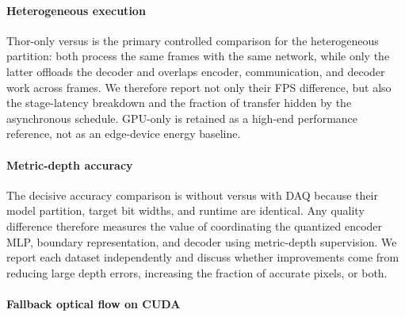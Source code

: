 \paragraph{Heterogeneous execution}
Thor-only versus \system{} is the primary controlled comparison for the
heterogeneous partition: both process the same frames with the same network,
while only the latter offloads the decoder and overlaps encoder,
communication, and decoder work across frames.  We therefore report not only
their FPS difference, but also the stage-latency breakdown and the fraction of
transfer hidden by the asynchronous schedule.  GPU-only is retained as a
high-end performance reference, not as an edge-device energy baseline.

\paragraph{Metric-depth accuracy}
The decisive accuracy comparison is \system{} without versus with DAQ because
their model partition, target bit widths, and runtime are identical.  Any
quality difference therefore measures the value of coordinating the quantized
encoder MLP, boundary representation, and decoder using metric-depth
supervision.  We report each dataset independently and discuss whether
improvements come from reducing large depth errors, increasing the fraction of
accurate pixels, or both.

\newpage

\begin{table}[t]
  \caption{Ablation on scheduling. \pending}
  \label{tab:abl-scheduling}
  \centering
\end{table}

\begin{table}[b]
  \caption{Fallback optical flow on CUDA. \pending}
  \label{tab:fallback}
  \centering
\end{table}

\paragraph{Fallback optical flow on CUDA}

